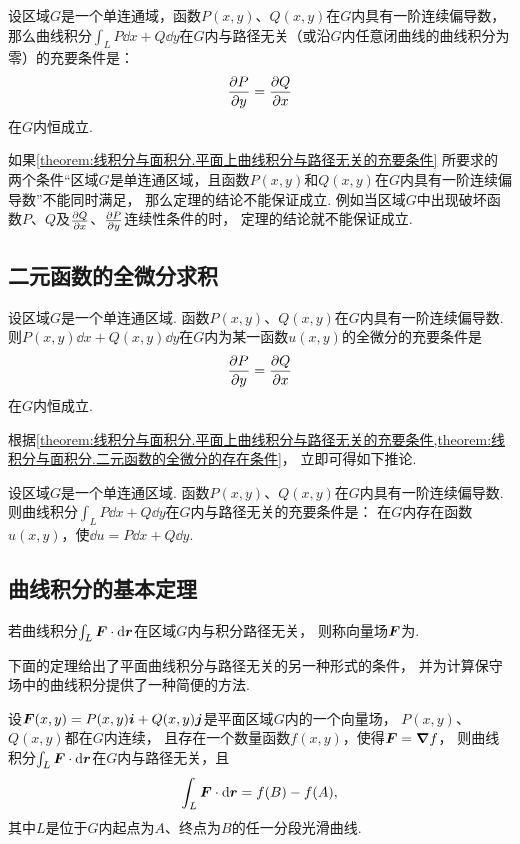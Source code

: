 \begin{theorem}\label{theorem:线积分与面积分.平面上曲线积分与路径无关的充要条件}
设区域\(G\)是一个单连通域，函数\(P(x,y)\)、\(Q(x,y)\)在\(G\)内具有一阶连续偏导数，
那么曲线积分\(\int_L P\dd{x}+Q\dd{y}\)在\(G\)内与路径无关（或沿\(G\)内任意闭曲线的曲线积分为零）的充要条件是：\[
	\pdv{P}{y}=\pdv{Q}{x}
\]在\(G\)内恒成立.
\end{theorem}
如果\cref{theorem:线积分与面积分.平面上曲线积分与路径无关的充要条件}
所要求的两个条件“区域\(G\)是单连通区域，且函数\(P(x,y)\)和\(Q(x,y)\)在\(G\)内具有一阶连续偏导数”不能同时满足，
那么定理的结论不能保证成立.
例如当区域\(G\)中出现破坏函数\(P\)、\(Q\)及\(\pdv{Q}{x}\)、\(\pdv{P}{y}\)连续性条件的时，
定理的结论就不能保证成立.

\subsection{二元函数的全微分求积}
\begin{theorem}\label{theorem:线积分与面积分.二元函数的全微分的存在条件}
设区域\(G\)是一个单连通区域.
函数\(P(x,y)\)、\(Q(x,y)\)在\(G\)内具有一阶连续偏导数.
则\(P(x,y)\dd{x}+Q(x,y)\dd{y}\)在\(G\)内为某一函数\(u(x,y)\)的全微分的充要条件是\[
\pdv{P}{y}=\pdv{Q}{x}
\]在\(G\)内恒成立.
\end{theorem}

根据\cref{theorem:线积分与面积分.平面上曲线积分与路径无关的充要条件,theorem:线积分与面积分.二元函数的全微分的存在条件}，
立即可得如下推论.
\begin{corollary}
设区域\(G\)是一个单连通区域.
函数\(P(x,y)\)、\(Q(x,y)\)在\(G\)内具有一阶连续偏导数.
则曲线积分\(\int_L{P\dd{x}+Q\dd{y}}\)在\(G\)内与路径无关的充要条件是：
在\(G\)内存在函数\(u(x,y)\)，使\(\dd{u}=P\dd{x}+Q\dd{y}\).
\end{corollary}

\subsection{曲线积分的基本定理}
\begin{definition}
若曲线积分\(\int_L \boldsymbol{F}\cdot\dd{\boldsymbol{r}}\)在区域\(G\)内与积分路径无关，
则称向量场\(\boldsymbol{F}\)为.
\end{definition}

下面的定理给出了平面曲线积分与路径无关的另一种形式的条件，
并为计算保守场中的曲线积分提供了一种简便的方法.
\begin{theorem}[曲线积分的基本定理]\label{theorem:线积分与面积分.曲线积分的基本定理}
设\(\boldsymbol{F}(x,y)=P(x,y)\boldsymbol{i}+Q(x,y)\boldsymbol{j}\)是平面区域\(G\)内的一个向量场，
\(P(x,y)\)、\(Q(x,y)\)都在\(G\)内连续，
且存在一个数量函数\(f(x,y)\)，使得\(\boldsymbol{F}=\grad f\)，
则曲线积分\(\int_L\boldsymbol{F}\cdot\dd{\boldsymbol{r}}\)在\(G\)内与路径无关，且
\begin{equation}\label{equation:线积分与面积分.曲线积分的基本公式}
	\int_L \boldsymbol{F} \cdot \dd{\boldsymbol{r}}
	= f(B)-f(A),
\end{equation}
其中\(L\)是位于\(G\)内起点为\(A\)、终点为\(B\)的任一分段光滑曲线.
\end{theorem}


